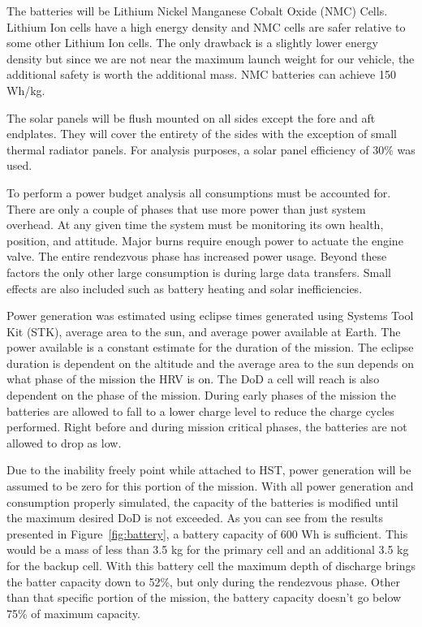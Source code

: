 \documentclass[paper=letter, fontsize=11pt]{scrartcl} %
\numberwithin{equation}{section} %
\numberwithin{figure}{section} %
\numberwithin{table}{section} %
\begin{document}
The batteries will be Lithium Nickel Manganese Cobalt Oxide (NMC) Cells. Lithium Ion cells have a high energy density and NMC cells are safer relative to some other Lithium Ion cells. The only drawback is a slightly lower energy density but since we are not near the maximum launch weight for our vehicle, the additional safety is worth the additional mass. NMC batteries can achieve 150 Wh/kg.

The solar panels will be flush mounted on all sides except the fore and aft endplates. They will cover the entirety of the sides with the exception of small thermal radiator panels. For analysis purposes, a solar panel efficiency of 30\% was used.

To perform a power budget analysis all consumptions must be accounted for. There are only a couple of phases that use more power than just system overhead. At any given time the system must be monitoring its own health, position, and attitude. Major burns require enough power to actuate the engine valve. The entire rendezvous phase has increased power usage. Beyond these factors the only other large consumption is during large data transfers. Small effects are also included such as battery heating and solar inefficiencies.

Power generation was estimated using eclipse times generated using Systems Tool Kit (STK), average area to the sun, and average power available at Earth. The power available is a constant estimate for the duration of the mission. The eclipse duration is dependent on the altitude and the average area to the sun depends on what phase of the mission the HRV is on. The DoD a cell will reach is also dependent on the phase of the mission. During early phases of the mission the batteries are allowed to fall to a lower charge level to reduce the charge cycles performed. Right before and during mission critical phases, the batteries are not allowed to drop as low.

Due to the inability freely point while attached to HST, power generation will be assumed to be zero for this portion of the mission. With all power generation and consumption properly simulated, the capacity of the batteries is modified until the maximum desired DoD is not exceeded. As you can see from the results presented in Figure~\ref{fig:battery}, a battery capacity of 600 Wh is sufficient. This would be a mass of less than 3.5 kg for the primary cell and an additional 3.5 kg for the backup cell. With this battery cell the maximum depth of discharge brings the batter capacity down to 52\%, but only during the rendezvous phase. Other than that specific portion of the mission, the battery capacity doesn't go below 75\% of maximum capacity.
\end{document}
